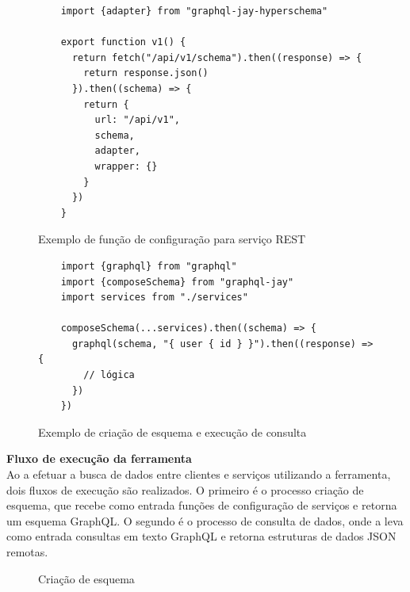 \begin{figure}[H]
  \centering
  \begin{verbatim}
    import {adapter} from "graphql-jay-hyperschema"
  
    export function v1() {
      return fetch("/api/v1/schema").then((response) => {
        return response.json()
      }).then((schema) => {
        return {
          url: "/api/v1",
          schema,
          adapter,
          wrapper: {}
        }
      })
    }
  \end{verbatim}
  \caption{Exemplo de função de configuração para serviço REST}
\end{figure}

\begin{figure}[H]
  \centering
  \begin{verbatim}
    import {graphql} from "graphql"
    import {composeSchema} from "graphql-jay"
    import services from "./services"
    
    composeSchema(...services).then((schema) => {
      graphql(schema, "{ user { id } }").then((response) => { 
        // lógica
      })
    })
  \end{verbatim}
  \caption{Exemplo de criação de esquema e execução de consulta}
\end{figure}

\textbf{Fluxo de execução da ferramenta} \\

Ao a efetuar a busca de dados entre clientes e serviços utilizando a ferramenta, dois fluxos de execução são realizados. O primeiro é o processo criação de esquema, que recebe como entrada funções de configuração de serviços e retorna um esquema GraphQL. O segundo é o processo de consulta de dados, onde a leva como entrada consultas em texto GraphQL e retorna estruturas de dados JSON remotas.

\begin{figure}[H]
  \centering
  \caption{Criação de esquema}
\end{figure}

